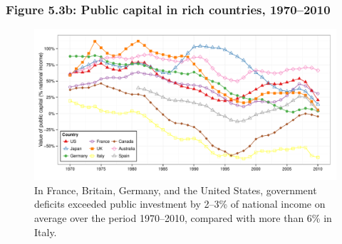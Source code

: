 \documentclass[t]{beamer}\usepackage[]{graphicx}\usepackage[]{color}
\newenvironment{knitrout}{}{} %
\begin{document}
\begin{frame}[label=Figure_5_3b]
\frametitle{Figure 5.3b: Public capital in rich countries, 1970--2010}
\begin{figure}[t]
\begin{minipage}[b]{\textwidth}
\centering
\begin{knitrout}\footnotesize
{}\color{fgcolor}

{\centering \includegraphics[width=1\linewidth]{figures/color/Figure_5_3b} 

}



\end{knitrout}
\caption{In France, Britain, Germany, and the United States, government deficits exceeded public investment by 2--3\% of national income on average over the period 1970--2010, compared with more than 6\% in Italy.}
\end{minipage}
\end{figure}
\end{frame}
\end{document}
